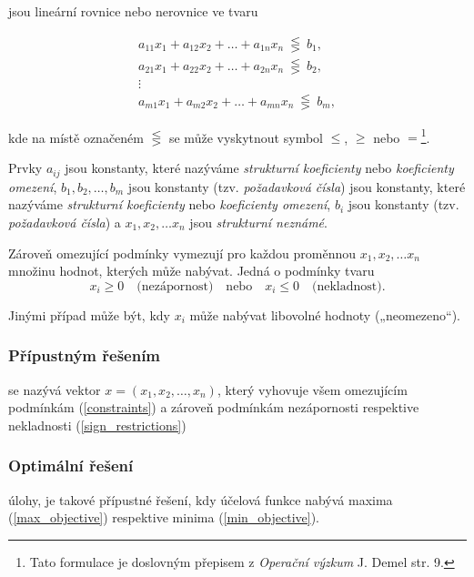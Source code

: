 jsou lineární rovnice nebo nerovnice ve tvaru

\begin{equation} \label{constraints}
    \begin{gathered}
        a_{11}x_1 + a_{12}x_2 + \ldots + a_{1n}x_n \ \lesseqgtr \ b_1, \\
        a_{21}x_1 + a_{22}x_2 + \ldots + a_{2n}x_n \ \lesseqgtr \ b_2, \\
        \vdots \\
        a_{m1}x_1 + a_{m2}x_2 + \ldots + a_{mn}x_n \ \lesseqgtr \ b_m,
    \end{gathered}
\end{equation}

kde na místě označeném $\lesseqgtr$ se může vyskytnout symbol $\leq$, $\geq$ nebo $=$\footnote{Tato formulace je doslovným přepisem z \textit{Operační výzkum} J. Demel \cite{demel} str. 9.}.

Prvky $a_{ij}$ jsou konstanty, které nazýváme \textit{strukturní koeficienty} nebo \textit{koeficienty omezení},
$b_1, b_2, \ldots, b_m$
jsou konstanty (tzv. \textit{požadavková čísla})
jsou konstanty, které nazýváme \textit{strukturní koeficienty} nebo \textit{koeficienty omezení}, $b_i$ jsou konstanty (tzv. \textit{požadavková čísla})
a $x_1, x_2, \ldots x_n$ jsou \textit{strukturní neznámé}.

Zároveň omezující podmínky vymezují pro každou proměnnou $x_1, x_2, \ldots x_n$ množinu hodnot, kterých může nabývat. 
Jedná o podmínky tvaru
\begin{equation} \label{sign_restrictions}
    x_i \geq 0 \quad \text{(nezápornost)} \quad \text{nebo} \quad x_i \leq 0 \quad \text{(nekladnost)}.
\end{equation}

Jinými případ může být, kdy $x_i$ může nabývat libovolné hodnoty („neomezeno“).

\subsubsection{Přípustným řešením} se nazývá vektor $x = (x_1, x_2, \ldots, x_n)$, který vyhovuje všem omezujícím podmínkám (\ref{constraints}) a zároveň podmínkám nezápornosti respektive nekladnosti (\ref{sign_restrictions})

\subsubsection{Optimální řešení} úlohy, je takové přípustné řešení, kdy účelová funkce nabývá maxima (\ref{max_objective}) respektive minima (\ref{min_objective}).

